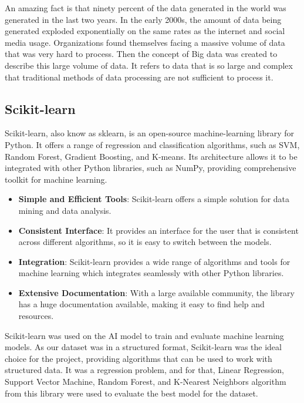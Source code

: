 An amazing fact is that ninety percent of the data generated in the world was generated in the last two years. In the early 2000s, the amount of data being
generated exploded exponentially on the same rates as the internet and social media usage. Organizations found themselves facing a massive volume of data 
that was very hard to process. Then the concept of Big data was created to describe this large volume of data. It refers to data that is so large and complex
that traditional methods of data processing are not sufficient to process it. \cite{bigdata}


\subsection{Scikit-learn}

Scikit-learn, also know as sklearn, is an open-source machine-learning library for Python. It offers a range of regression and classification algorithms,
such as SVM, Random Forest, Gradient Boosting, and K-means. Its architecture allows it to be integrated with other Python libraries, such as NumPy, providing 
comprehensive toolkit for machine learning. \cite{scikit}

\begin{itemize}
    \item \textbf{Simple and Efficient Tools}: Scikit-learn offers a simple solution for data mining and data analysis.
    \item \textbf{Consistent Interface}: It provides an interface for the user that is consistent across different algorithms, so it is easy to switch between the models.
    \item \textbf{Integration}: Scikit-learn provides a wide range of algorithms and tools for machine learning which integrates seamlessly with other Python libraries.
    \item \textbf{Extensive Documentation}: With a large available community, the library has a huge documentation available, making it easy to find help and resources.
\end{itemize}

Scikit-learn was used on the AI model to train and evaluate machine learning models. As our dataset was in a structured format, Scikit-learn was the ideal choice for the project, 
providing algorithms that can be used to work with structured data. It was a regression problem, and for that, Linear Regression, Support Vector Machine,
Random Forest, and K-Nearest Neighbors algorithm from this library were used to evaluate the best model for the dataset.

